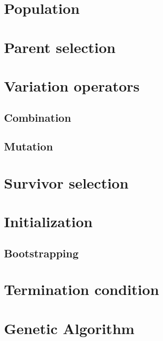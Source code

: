 \section{Population}
\section{Parent selection}
\section{Variation operators}
\subsection{Combination}
\subsection{Mutation}
\section{Survivor selection}
\section{Initialization}
\subsection{Bootstrapping}
\section{Termination condition}
\section{Genetic Algorithm}
